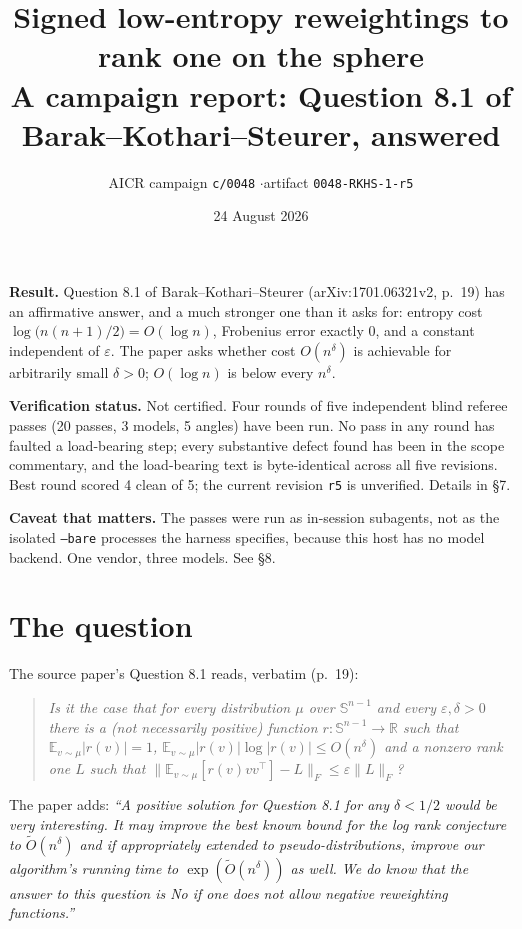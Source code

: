 \documentclass[11pt]{article}
\title{\vspace{-1.5cm}Signed low-entropy reweightings to rank one on the sphere\\[0.3em]
\large A campaign report: Question 8.1 of Barak--Kothari--Steurer, answered}
\author{AICR campaign \texttt{c/0048} \quad$\cdot$\quad artifact \texttt{0048-RKHS-1-r5}}
\date{24 August 2026}
\theoremstyle{remark}
\newcommand{\Sph}{\mathbb{S}^{n-1}}
\newcommand{\R}{\mathbb{R}}
\newcommand{\Ex}{\mathbb{E}}
\begin{document}
\maketitle

\begin{framed}
\noindent\textbf{Result.} Question 8.1 of Barak--Kothari--Steurer (arXiv:1701.06321v2,
p.~19) has an affirmative answer, and a much stronger one than it asks for: entropy cost
$\log\!\big(n(n+1)/2\big) = O(\log n)$, Frobenius error exactly $0$, and a constant
independent of $\varepsilon$. The paper asks whether cost $O(n^{\delta})$ is achievable for
arbitrarily small $\delta>0$; $O(\log n)$ is below every $n^{\delta}$.

\smallskip
\noindent\textbf{Verification status.} Not certified. Four rounds of five independent blind
referee passes (20 passes, 3 models, 5 angles) have been run. No pass in any round has
faulted a load-bearing step; every substantive defect found has been in the scope
commentary, and the load-bearing text is byte-identical across all five revisions. Best
round scored 4 clean of 5; the current revision \texttt{r5} is unverified. Details in \S7.

\smallskip
\noindent\textbf{Caveat that matters.} The passes were run as in-session subagents, not as
the isolated \texttt{--bare} processes the harness specifies, because this host has no model
backend. One vendor, three models. See \S8.
\end{framed}

\section{The question}

The source paper's Question 8.1 reads, verbatim (p.~19):

\begin{quote}\itshape
Is it the case that for every distribution $\mu$ over $\Sph$ and every $\varepsilon,\delta>0$
there is a (not necessarily positive) function $r:\Sph\to\R$ such that
$\Ex_{v\sim\mu}|r(v)|=1$, $\Ex_{v\sim\mu}|r(v)|\log|r(v)|\leqslant O(n^{\delta})$ and a
nonzero rank one $L$ such that $\|\Ex_{v\sim\mu}[r(v)vv^{\top}]-L\|_F\leqslant
\varepsilon\|L\|_F$?
\end{quote}

\noindent The paper adds: \emph{``A positive solution for Question 8.1 for any $\delta<1/2$
would be very interesting. It may improve the best known bound for the log rank conjecture
to $\tilde O(n^{\delta})$ and if appropriately extended to pseudo-distributions, improve our
algorithm's running time to $\exp(\tilde O(n^{\delta}))$ as well. We do know that the answer
to this question is No if one does not allow negative reweighting functions.''}
\end{document}
